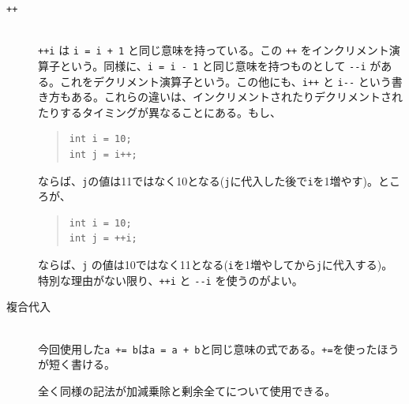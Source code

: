 \begin{description}
    \item[\texttt{++}]\mbox{}\\
          \texttt{++i} は \texttt{i = i + 1} と同じ意味を持っている。この \texttt{++} をインクリメント演算子という。同様に、\texttt{i = i - 1} と同じ意味を持つものとして \texttt{{-}{-}i} がある。これをデクリメント演算子という。この他にも、\texttt{i++} と \texttt{i{-}{-}} という書き方もある。これらの違いは、インクリメントされたりデクリメントされたりするタイミングが異なることにある。もし、
          \begin{quote}
              \begin{verbatim}
int i = 10;
int j = i++;
\end{verbatim}
          \end{quote}
          ならば、\texttt{j}の値は11ではなく10となる(\texttt{j}に代入した後で\texttt{i}を1増やす)。ところが、
          \begin{quote}
              \begin{verbatim}
int i = 10;
int j = ++i;
\end{verbatim}
          \end{quote}
          ならば、\texttt{j} の値は10ではなく11となる(\texttt{i}を1増やしてから\texttt{j}に代入する)。
          特別な理由がない限り、\texttt{++i} と \texttt{{-}{-}i} を使うのがよい。
    \item[複合代入]\mbox{}\\
          今回使用した\texttt{a += b}は\texttt{a = a + b}と同じ意味の式である。\texttt{+=}を使ったほうが短く書ける。

          全く同様の記法が加減乗除と剰余全てについて使用できる。
\end{description}


